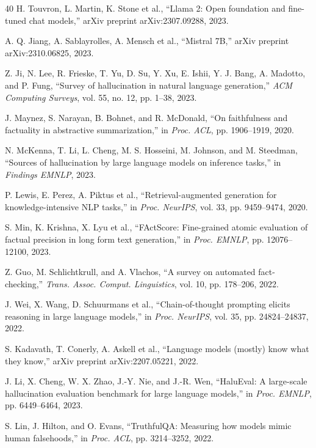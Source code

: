 \documentclass{article}
\begin{document}
\begin{thebibliography}{40}
H. Touvron, L. Martin, K. Stone et al.,
``Llama 2: Open foundation and fine-tuned chat models,''
arXiv preprint arXiv:2307.09288, 2023.

A. Q. Jiang, A. Sablayrolles, A. Mensch et al.,
``Mistral 7B,''
arXiv preprint arXiv:2310.06825, 2023.

Z. Ji, N. Lee, R. Frieske, T. Yu, D. Su, Y. Xu, E. Ishii, Y. J. Bang, A. Madotto, and P. Fung,
``Survey of hallucination in natural language generation,''
\textit{ACM Computing Surveys}, vol. 55, no. 12, pp. 1--38, 2023.

J. Maynez, S. Narayan, B. Bohnet, and R. McDonald,
``On faithfulness and factuality in abstractive summarization,''
in \textit{Proc. ACL}, pp. 1906--1919, 2020.

N. McKenna, T. Li, L. Cheng, M. S. Hosseini, M. Johnson, and M. Steedman,
``Sources of hallucination by large language models on inference tasks,''
in \textit{Findings EMNLP}, 2023.

P. Lewis, E. Perez, A. Piktus et al.,
``Retrieval-augmented generation for knowledge-intensive NLP tasks,''
in \textit{Proc. NeurIPS}, vol. 33, pp. 9459--9474, 2020.

S. Min, K. Krishna, X. Lyu et al.,
``FActScore: Fine-grained atomic evaluation of factual precision in long form text generation,''
in \textit{Proc. EMNLP}, pp. 12076--12100, 2023.

Z. Guo, M. Schlichtkrull, and A. Vlachos,
``A survey on automated fact-checking,''
\textit{Trans. Assoc. Comput. Linguistics}, vol. 10, pp. 178--206, 2022.

J. Wei, X. Wang, D. Schuurmans et al.,
``Chain-of-thought prompting elicits reasoning in large language models,''
in \textit{Proc. NeurIPS}, vol. 35, pp. 24824--24837, 2022.

S. Kadavath, T. Conerly, A. Askell et al.,
``Language models (mostly) know what they know,''
arXiv preprint arXiv:2207.05221, 2022.

J. Li, X. Cheng, W. X. Zhao, J.-Y. Nie, and J.-R. Wen,
``HaluEval: A large-scale hallucination evaluation benchmark for large language models,''
in \textit{Proc. EMNLP}, pp. 6449--6464, 2023.

S. Lin, J. Hilton, and O. Evans,
``TruthfulQA: Measuring how models mimic human falsehoods,''
in \textit{Proc. ACL}, pp. 3214--3252, 2022.


\end{thebibliography}
\end{document}

